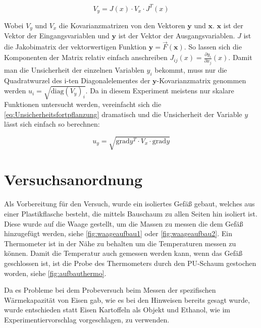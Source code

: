 \documentclass[11pt, ngerman]{scrartcl}
\begin{document}
\begin{equation}
    \label{eq:Unsicherheitsfortpflanzung}
    V_y = J(x) \cdot V_x \cdot J^{T}(x)
\end{equation}

Wobei $V_y$ und $V_x$ die Kovarianzmatrizen von den Vektoren $\bm{y}$ und $\bm{x}$.
$\bm{x}$ ist der Vektor der Eingangsvariablen und $\bm{y}$ ist der Vektor der Ausgangsvariablen.
$J$ ist die Jakobimatrix der vektorwertigen Funktion $\bm{y} = \vec{F}(\bm{x})$.
So lassen sich die Komponenten der Matrix relativ einfach anschreiben $J_{ij}(x) = \frac{\partial{y_i}}{\partial{x_j}}(x)$.
Damit man die Unsicherheit der einzelnen Variablen $y_i$ bekommt, muss nur die Quadratwurzel des i-ten Diagonalelementes der 
$\bm{y}$-Kovarianzmatrix genommen werden $u_i= \sqrt{\mathrm{diag}(V_y)_i}$.
Da in diesem Experiment meistens nur skalare Funktionen untersucht werden, vereinfacht
sich die \autoref{eq:Unsicherheitsfortpflanzung} dramatisch und die Unsicherheit
der Variable $y$ lässt sich einfach so berechnen:

\begin{equation}
    \label{eq:graduncentainty}
    u_y = \sqrt{\mathrm{grad} y^T \cdot V_x \cdot \mathrm{grad} y}
\end{equation}

\section{Versuchsanordnung}
\label{sec:versuchsanordnung}

Als Vorbereitung für den Versuch, wurde ein isoliertes Gefäß gebaut, welches
aus einer Plastikflasche besteht, die mittels Bauschaum zu allen Seiten hin
isoliert ist. Diese wurde auf die Waage gestellt, um die Massen
zu messen die dem Gefäß hinzugefügt werden, siehe \autoref{fig:waageaufbau1} oder \autoref{fig:waageaufbau2}. Ein Thermometer ist in
der Nähe zu behalten um die Temperaturen messen zu können.
Damit die Temperatur auch gemessen werden kann, wenn das Gefäß geschlossen
ist, ist die Probe des Thermometers durch den PU-Schaum gestochen worden, siehe
\autoref{fig:aufbauthermo}.


Da es Probleme bei dem Probeversuch beim Messen der spezifischen Wärmekapazität
von Eisen gab, wie es bei den Hinweisen \cite{wärmehinweise} bereits gesagt wurde, wurde entschieden statt Eisen
Kartoffeln als Objekt und Ethanol, wie im Experimentiervorschlag vorgeschlagen,
zu verwenden.
\end{document}
